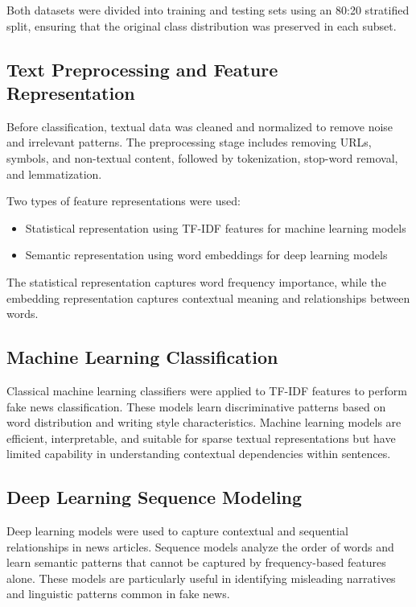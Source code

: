 \documentclass[conference]{IEEEtran}
\begin{document}
Both datasets were divided into training and testing sets using an 80:20 stratified split, ensuring that the original class distribution was preserved in each subset.

\subsection{Text Preprocessing and Feature Representation}
Before classification, textual data was cleaned and normalized to remove noise and irrelevant patterns. The preprocessing stage includes removing URLs, symbols, and non-textual content, followed by tokenization, stop-word removal, and lemmatization.

Two types of feature representations were used:
\begin{itemize}
    \item Statistical representation using TF-IDF features for machine learning models
    \item Semantic representation using word embeddings for deep learning models
\end{itemize}
The statistical representation captures word frequency importance, while the embedding representation captures contextual meaning and relationships between words.

\subsection{Machine Learning Classification}
Classical machine learning classifiers were applied to TF-IDF features to perform fake news classification. These models learn discriminative patterns based on word distribution and writing style characteristics. Machine learning models are efficient, interpretable, and suitable for sparse textual representations but have limited capability in understanding contextual dependencies within sentences.

\subsection{Deep Learning Sequence Modeling}
Deep learning models were used to capture contextual and sequential relationships in news articles. Sequence models analyze the order of words and learn semantic patterns that cannot be captured by frequency-based features alone. These models are particularly useful in identifying misleading narratives and linguistic patterns common in fake news.
\end{document}
